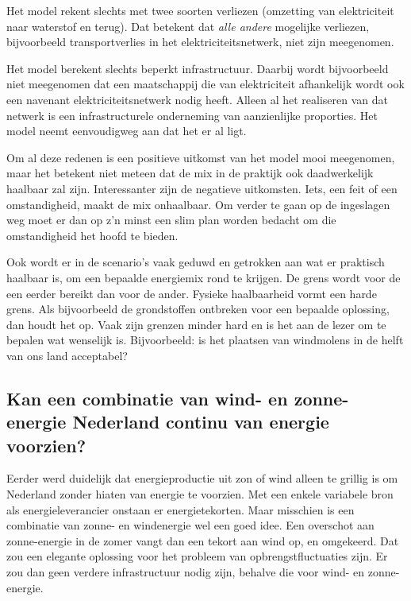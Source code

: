\documentclass[
  11pt,
  a4paper,
]{book}
\begin{document}
Het model rekent slechts met twee soorten verliezen (omzetting van elektriciteit naar waterstof en terug). Dat betekent dat \emph{alle andere} mogelijke verliezen, bijvoorbeeld transportverlies in het elektriciteitsnetwerk, niet zijn meegenomen.

Het model berekent slechts beperkt infrastructuur. Daarbij wordt bijvoorbeeld niet meegenomen dat een maatschappij die van elektriciteit afhankelijk wordt ook een navenant elektriciteitsnetwerk nodig heeft. Alleen al het realiseren van dat netwerk is een infrastructurele onderneming van aanzienlijke proporties. Het model neemt eenvoudigweg aan dat het er al ligt.

Om al deze redenen is een positieve uitkomst van het model mooi meegenomen, maar het betekent niet meteen dat de mix in de praktijk ook daadwerkelijk haalbaar zal zijn. Interessanter zijn de negatieve uitkomsten. Iets, een feit of een omstandigheid, maakt de mix onhaalbaar. Om verder te gaan op de ingeslagen weg moet er dan op z'n minst een slim plan worden bedacht om die omstandigheid het hoofd te bieden.

Ook wordt er in de scenario's vaak geduwd en getrokken aan wat er praktisch haalbaar is, om een bepaalde energiemix rond te krijgen. De grens wordt voor de een eerder bereikt dan voor de ander. Fysieke haalbaarheid vormt een harde grens. Als bijvoorbeeld de grondstoffen ontbreken voor een bepaalde oplossing, dan houdt het op. Vaak zijn grenzen minder hard en is het aan de lezer om te bepalen wat wenselijk is. Bijvoorbeeld: is het plaatsen van windmolens in de helft van ons land acceptabel?

\hypertarget{kan-een-combinatie-van-wind--en-zonne-energie-nederland-continu-van-energie-voorzien}{%
\subsection{Kan een combinatie van wind- en zonne-energie Nederland continu van energie voorzien?}\label{kan-een-combinatie-van-wind--en-zonne-energie-nederland-continu-van-energie-voorzien}}

Eerder werd duidelijk dat energieproductie uit zon of wind alleen te grillig is om Nederland zonder hiaten van energie te voorzien. Met een enkele variabele bron als energieleverancier onstaan er energietekorten. Maar misschien is een combinatie van zonne- en windenergie wel een goed idee. Een overschot aan zonne-energie in de zomer vangt dan een tekort aan wind op, en omgekeerd. Dat zou een elegante oplossing voor het probleem van opbrengstfluctuaties zijn. Er zou dan geen verdere infrastructuur nodig zijn, behalve die voor wind- en zonne-energie.
\end{document}
